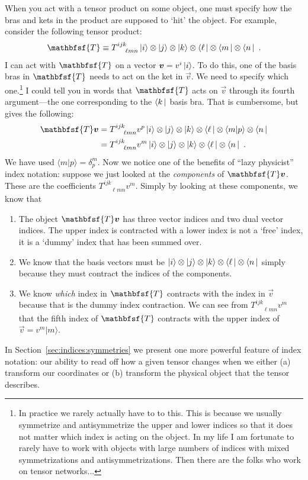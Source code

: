 \documentclass[
  11pt,
	colorful,
	raggedright,
]{tufte-style-thesis-flip}
\newcommand{\tens}[1]{\mathbfsf{#1}}
\begin{document}
When you act with a tensor product on some object, one must specify how the bras and kets in the product are supposed to `hit' the object. For example, consider the following tensor product:
\begin{align}
\tens{T} \equiv
  T^{ijk}_{\phantom{ijk}\ell m n}\ket{i}\otimes\ket{j}\otimes\ket{k}
  \otimes\bra{\ell}\otimes\bra{m}\otimes\bra{n} \ .
\end{align}
I can act with $\tens{T}$ on a vector $\boldsymbol{v} = v^i\left|i\right\rangle$. To do this, one of the basis bras in $\tens{T}$ needs to act on the ket in $\vec{v}$. We need to specify which one.\footnote{In practice we rarely actually have to to this. This is because we usually symmetrize and antisymmetrize the upper and lower indices so that it does not matter which index is acting on the object. In my life I am fortunate to rarely have to work with objects with large numbers of indices with mixed symmetrizations and antisymmetrizations. Then there are the folks who work on tensor networks...} I could tell you in words that $\tens{T}$ acts on $\vec{v}$ through its fourth argument---the one corresponding to the $\left\langle k\,\right|$ basis bra. That is cumbersome, but gives the following:
\begin{align}
  \tens{T}\vec{v} &= T^{ijk}_{\phantom{ijk}\ell m n}
  v^p
  \ket{i}\otimes\ket{j}\otimes\ket{k}
  \otimes\bra{\ell}\otimes\langle m|p\rangle\otimes\bra{n}
  \\ &=
  T^{ijk}_{\phantom{ijk}\ell m n}
  v^m
  \ket{i}\otimes\ket{j}\otimes\ket{k}
  \otimes\bra{\ell}\otimes\bra{n} \ .
\end{align}
We have used $\langle m|p\rangle = \delta^m_p$. Now we notice one of the benefits of ``lazy physicist'' index notation: suppose we just looked at the \emph{components} of $\tens{T}\vec{v}$. These are the coefficients $T^{ijk}_{\phantom{ijk}\ell m n}v^m$. Simply by looking at these components, we know that
\begin{enumerate}
  \item The object $\tens{T}\vec{v}$ has three vector indices and two dual vector indices. The upper index is contracted with a lower index is not a `free' index, it is a `dummy' index that has been summed over. 
  \item We know that the basis vectors must be $\left|i\right\rangle\otimes\left|j\right\rangle\otimes\left|k\right\rangle
  \otimes\left\langle\ell\,\right|\otimes\left\langle n\,\right|$ simply because they must contract the indices of the components.
  \item We know \emph{which} index in $\tens{T}$ contracts with the index in $\vec{v}$ because that is the dummy index contraction. We can see from $T^{ijk}_{\phantom{ijk}\ell m n}v^m$ that the fifth index of $\tens{T}$ contracts with the upper index of $\vec{v}=v^m |m\rangle$.
\end{enumerate}
In Section~\ref{sec:indices:symmetries} we present one more powerful feature of index notation: our ability to read off how a given tensor changes when we either (a) transform our coordinates or (b) transform the physical object that the tensor describes.
\end{document}
